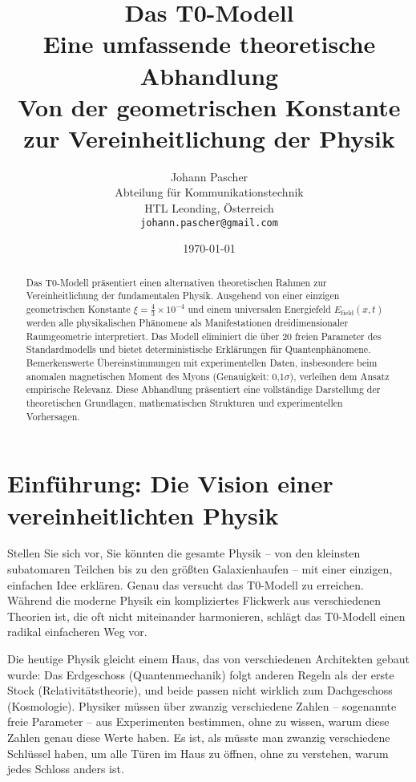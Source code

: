 \documentclass[12pt,a4paper]{article}
\title{{\Huge \color{t0blue}Das T0-Modell}\\
	{\LARGE Eine umfassende theoretische Abhandlung}\\
	\vspace{1cm}
	{\Large Von der geometrischen Konstante zur Vereinheitlichung der Physik}}
\author{{\Large Johann Pascher}\\
	Abteilung für Kommunikationstechnik\\
	HTL Leonding, Österreich\\
	\texttt{johann.pascher@gmail.com}}
\date{\today}
\newcommand{\xipar}{\ensuremath{\xi}}
\newcommand{\Efield}{E_\text{field}}
\begin{document}
	
	\maketitle
	
	\begin{abstract}
		\noindent Das T0-Modell präsentiert einen alternativen theoretischen Rahmen zur Vereinheitlichung der fundamentalen Physik. Ausgehend von einer einzigen geometrischen Konstante $\xipar = \frac{4}{3} \times 10^{-4}$ und einem universalen Energiefeld $\Efield(x,t)$ werden alle physikalischen Phänomene als Manifestationen dreidimensionaler Raumgeometrie interpretiert. Das Modell eliminiert die über 20 freien Parameter des Standardmodells und bietet deterministische Erklärungen für Quantenphänomene. Bemerkenswerte Übereinstimmungen mit experimentellen Daten, insbesondere beim anomalen magnetischen Moment des Myons (Genauigkeit: 0,1$\sigma$), verleihen dem Ansatz empirische Relevanz. Diese Abhandlung präsentiert eine vollständige Darstellung der theoretischen Grundlagen, mathematischen Strukturen und experimentellen Vorhersagen.
	\end{abstract}
	
	\tableofcontents
	\newpage
	
	\section{Einführung: Die Vision einer vereinheitlichten Physik}
	
	Stellen Sie sich vor, Sie könnten die gesamte Physik -- von den kleinsten subatomaren Teilchen bis zu den größten Galaxienhaufen -- mit einer einzigen, einfachen Idee erklären. Genau das versucht das T0-Modell zu erreichen. Während die moderne Physik ein kompliziertes Flickwerk aus verschiedenen Theorien ist, die oft nicht miteinander harmonieren, schlägt das T0-Modell einen radikal einfacheren Weg vor.
	
	Die heutige Physik gleicht einem Haus, das von verschiedenen Architekten gebaut wurde: Das Erdgeschoss (Quantenmechanik) folgt anderen Regeln als der erste Stock (Relativitätstheorie), und beide passen nicht wirklich zum Dachgeschoss (Kosmologie). Physiker müssen über zwanzig verschiedene Zahlen -- sogenannte freie Parameter -- aus Experimenten bestimmen, ohne zu wissen, warum diese Zahlen genau diese Werte haben. Es ist, als müsste man zwanzig verschiedene Schlüssel haben, um alle Türen im Haus zu öffnen, ohne zu verstehen, warum jedes Schloss anders ist.
	
\end{document}
